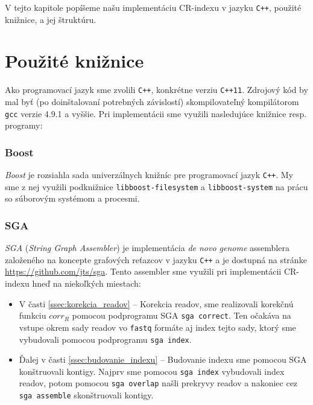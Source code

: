 
V tejto kapitole popíšeme našu implementáciu CR-indexu v jazyku \texttt{C++}, použité knižnice, a jej štruktúru.

\section{Použité knižnice}

Ako programovací jazyk sme zvolili \texttt{C++}, konkrétne verziu \texttt{C++11}. Zdrojový kód by mal byť (po doinštalovaní potrebných závislostí) skompilovateľný kompilátorom \texttt{gcc} verzie 4.9.1 a vyššie. Pri implementácii sme využili nasledujúce knižnice resp. programy:

\subsubsection{Boost}
\emph{Boost} je rozsiahla sada univerzálnych knižníc pre programovací jazyk \texttt{C++}. My sme z nej využili podknižnice \texttt{libboost-filesystem} a \texttt{libboost-system} na prácu so súborovým systémom a procesmi.

\subsubsection{SGA}
\emph{SGA} (\emph{String Graph Assembler}) \cite{SD11} je implementácia \emph{de novo genome} assemblera založeného na koncepte grafových reťazcov v jazyku \texttt{C++} a je dostupná na stránke \url{https://github.com/jts/sga}. Tento assembler sme využili pri implementácii CR-indexu hneď na niekoľkých miestach:

\begin{itemize}
\item V časti \ref{ssec:korekcia_readov} -- Korekcia readov, sme realizovali korekčnú funkciu $corr_R$ pomocou podprogramu SGA \texttt{sga correct}. Ten očakáva na vstupe okrem sady readov vo \texttt{fastq} formáte aj index tejto sady, ktorý sme vybudovali pomocou podprogramu \texttt{sga index}.
\item Ďalej v časti \ref{ssec:budovanie_indexu} -- Budovanie indexu sme pomocou SGA konštruovali kontigy. Najprv sme pomocou \texttt{sga index} vybudovali index readov, potom pomocou \texttt{sga overlap} našli prekryvy readov a nakoniec cez \texttt{sga assemble} skonštruovali kontigy.
\end{itemize}


